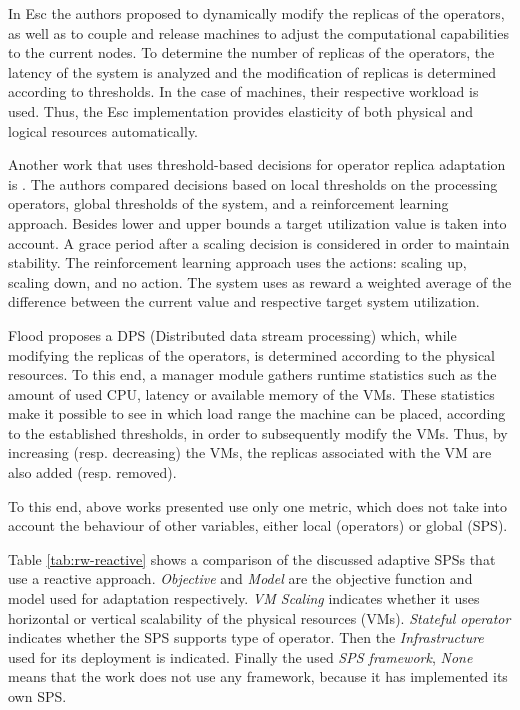 In Esc \citep{SatzgerHLD11} the authors proposed to dynamically modify the replicas of the operators, as well as to couple and release machines to adjust the computational capabilities to the current nodes. To determine the number of replicas of the operators, the latency of the system is analyzed and the modification of replicas is determined according to thresholds. In the case of machines, their respective workload is used. Thus, the Esc implementation provides elasticity of both physical and logical resources automatically.

Another work that uses threshold-based decisions for operator replica adaptation is \citep{HeinzeJHF14}. The authors compared decisions based on local thresholds on the processing operators, global thresholds of the system, and a reinforcement learning approach. Besides lower and upper bounds a target utilization value is taken into account. A grace period after a scaling decision is considered in order to maintain stability. The reinforcement learning approach uses the actions: scaling up, scaling down, and no action. The system uses as reward a weighted average of the difference between the current value and respective target system utilization. 

Flood \citep{AlvesBM10} proposes a DPS (Distributed data stream processing) which, while modifying the replicas of the operators, is determined according to the physical resources. To this end, a manager module gathers runtime statistics such as the amount of used CPU, latency or available memory of the VMs. These statistics make it possible to see in which load range the machine can be placed, according to the established thresholds, in order to subsequently modify the VMs. Thus, by increasing (resp. decreasing) the VMs, the replicas associated with the VM are also added (resp. removed). 

To this end, above works presented use only one metric, which does not take into account the behaviour of other variables, either local (operators) or global (SPS). %

Table \ref{tab:rw-reactive} shows a comparison of the discussed adaptive SPSs that use a reactive approach. \textit{Objective} and \textit{Model} are the objective function and model used for adaptation respectively. \textit{VM Scaling} indicates whether it uses horizontal or vertical scalability of the physical resources (VMs). \textit{Stateful operator} indicates whether the SPS supports type of operator. Then the \textit{Infrastructure} used for its deployment is indicated. Finally the used \textit{SPS framework}, \textit{None} means that the work does not use any framework, because it has implemented its own SPS.

